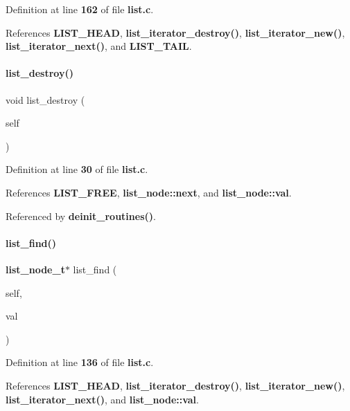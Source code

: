 Definition at line \textbf{ 162} of file \textbf{ list.\+c}.



References \textbf{ L\+I\+S\+T\+\_\+\+H\+E\+AD}, \textbf{ list\+\_\+iterator\+\_\+destroy()}, \textbf{ list\+\_\+iterator\+\_\+new()}, \textbf{ list\+\_\+iterator\+\_\+next()}, and \textbf{ L\+I\+S\+T\+\_\+\+T\+A\+IL}.

\mbox{\label{list_8c_ac2d2be572a896cccd0e76d56eeefcbdb}} 
\paragraph{list\+\_\+destroy()}
{\footnotesize\ttfamily void list\+\_\+destroy (\begin{DoxyParamCaption}\item[{\textbf{ list\+\_\+t} $\ast$}]{self }\end{DoxyParamCaption})}



Definition at line \textbf{ 30} of file \textbf{ list.\+c}.



References \textbf{ L\+I\+S\+T\+\_\+\+F\+R\+EE}, \textbf{ list\+\_\+node\+::next}, and \textbf{ list\+\_\+node\+::val}.



Referenced by \textbf{ deinit\+\_\+routines()}.

\mbox{\label{list_8c_a5d73352b7bfa0c5a8b33289d7b27a374}} 
\paragraph{list\+\_\+find()}
{\footnotesize\ttfamily \textbf{ list\+\_\+node\+\_\+t}$\ast$ list\+\_\+find (\begin{DoxyParamCaption}\item[{\textbf{ list\+\_\+t} $\ast$}]{self,  }\item[{void $\ast$}]{val }\end{DoxyParamCaption})}



Definition at line \textbf{ 136} of file \textbf{ list.\+c}.



References \textbf{ L\+I\+S\+T\+\_\+\+H\+E\+AD}, \textbf{ list\+\_\+iterator\+\_\+destroy()}, \textbf{ list\+\_\+iterator\+\_\+new()}, \textbf{ list\+\_\+iterator\+\_\+next()}, and \textbf{ list\+\_\+node\+::val}.

